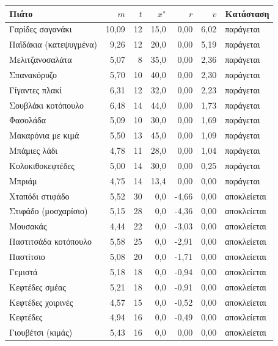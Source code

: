 \setlength{\tabcolsep}{6pt}
\begin{tabular}{@{}lrrrrrl@{}}
\toprule
\textbf{Πιάτο} & $m$ & $t$ & $x^\star$ & $r$ & $v$ & \textbf{Κατάσταση} \\
\midrule
Γαρίδες σαγανάκι & 10,09 & 12 & 15,0 & 0,00 & 6,02 & παράγεται \\
Παϊδάκια (κατεψυγμένα) & 9,26 & 12 & 20,0 & 0,00 & 5,19 & παράγεται \\
Μελιτζανοσαλάτα & 5,07 & 8 & 35,0 & 0,00 & 2,36 & παράγεται \\
Σπανακόρυζο & 5,70 & 10 & 40,0 & 0,00 & 2,30 & παράγεται \\
Γίγαντες πλακί & 6,31 & 12 & 32,0 & 0,00 & 2,23 & παράγεται \\
Σουβλάκι κοτόπουλο & 6,48 & 14 & 44,0 & 0,00 & 1,73 & παράγεται \\
Φασολάδα & 5,09 & 10 & 30,0 & 0,00 & 1,69 & παράγεται \\
Μακαρόνια με κιμά & 5,50 & 13 & 45,0 & 0,00 & 1,09 & παράγεται \\
Μπάμιες λάδι & 4,78 & 11 & 28,0 & 0,00 & 1,04 & παράγεται \\
Κολοκιθοκεφτέδες & 5,00 & 14 & 30,0 & 0,00 & 0,25 & παράγεται \\
Μπριάμ & 4,75 & 14 & 13,4 & 0,00 & 0,00 & παράγεται \\
\addlinespace
Χταπόδι στιφάδο & 5,52 & 30 & 0,0 & -4,66 & 0,00 & αποκλείεται \\
Στιφάδο (μοσχαρίσιο) & 5,15 & 28 & 0,0 & -4,36 & 0,00 & αποκλείεται \\
Μουσακάς & 4,44 & 22 & 0,0 & -3,03 & 0,00 & αποκλείεται \\
Παστιτσάδα κοτόπουλο & 5,58 & 25 & 0,0 & -2,91 & 0,00 & αποκλείεται \\
Παστίτσιο & 5,08 & 20 & 0,0 & -1,71 & 0,00 & αποκλείεται \\
Γεμιστά & 5,18 & 18 & 0,0 & -0,94 & 0,00 & αποκλείεται \\
Κεφτέδες σμέας & 5,21 & 18 & 0,0 & -0,91 & 0,00 & αποκλείεται \\
Κεφτέδες χοιρινές & 4,57 & 15 & 0,0 & -0,52 & 0,00 & αποκλείεται \\
Κεφτέδες & 4,94 & 16 & 0,0 & -0,49 & 0,00 & αποκλείεται \\
Γιουβέτσι (κιμάς) & 5,43 & 16 & 0,0 & 0,00 & 0,00 & αποκλείεται \\
\bottomrule
\end{tabular}

